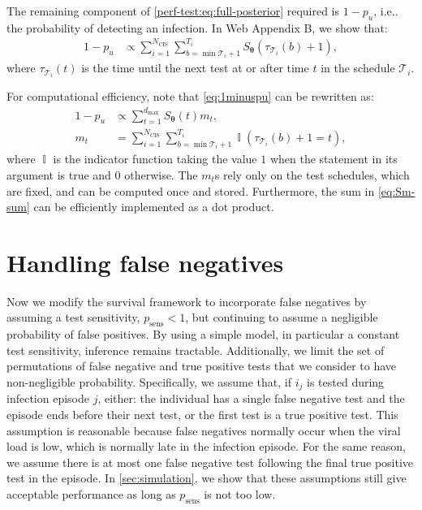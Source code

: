 \documentclass[referee,useAMS,usenatbib]{biom}
\makeatletter
\DeclareMathOperator{\indicator}{\mathbb{I}}
\renewcommand{\vec}[1]{\bm{#1}}
\newcommand{\dmax}{d_\text{max}}
\newcommand{\psens}{p_\text{sens}}
\newcommand{\Ncis}{N_\text{CIS}}
\newcommand{\sched}{\mathcal{T}}
\DeclareRobustCommand\onedot{\futurelet\@let@token\@onedot}
\def\@onedot{\ifx\@let@token.\else.\null\fi\xspace}
\def\ie{i.e\onedot} \def\Ie{{I.e}\onedot}
\makeatother
\begin{document}
The remaining component of \cref{perf-test:eq:full-posterior} required is $1- p_u$, \ie the probability of detecting an infection.
In Web Appendix B, we show that:
\begin{align}
  1 - p_u
  &\propto \sum_{i=1}^{\Ncis}\sum_{b = \min \sched_{i} + 1}^{T_{i}} S_{\vec{\theta}}(\tau_{\sched_{i}}(b) + 1),
  \label{eq:1minuspu}
\end{align}
where $\tau_{\sched_i}(t)$ is the time until the next test at or after time $t$ in the schedule $\sched_i$.

For computational efficiency, note that \cref{eq:1minuspu} can be rewritten as:
\begin{align}
  1- p_u
  &\propto \sum_{t=1}^{\dmax} S_{\vec\theta}(t) m_t,
  \label{eq:Sm-sum} \\
  m_t &= \sum_{i=1}^{\Ncis} \sum_{b = \min \sched_{i} + 1}^{T_{i}} \indicator(\tau_{\sched_{i}}(b) + 1 = t),
\end{align}
where $\indicator$ is the indicator function taking the value $1$ when the statement in its argument is true and $0$ otherwise.
The $m_t$s rely only on the test schedules, which are fixed, and can be computed once and stored.
Furthermore, the sum in \cref{eq:Sm-sum} can be efficiently implemented as a dot product.

\section{Handling false negatives} \label{sec:false-negatives}

Now we modify the survival framework to incorporate false negatives by assuming a test sensitivity, $\psens < 1$, but continuing to assume a negligible probability of false positives.
By using a simple model, in particular a constant test sensitivity, inference remains tractable.
Additionally, we limit the set of permutations of false negative and true positive tests that we consider to have non-negligible probability.
Specifically, we assume that, if $i_j$ is tested during infection episode $j$, either: the individual has a single false negative test and the episode ends before their next test, or the first test is a true positive test.
This assumption is reasonable because false negatives normally occur when the viral load is low, which is normally late in the infection episode.
For the same reason, we assume there is at most one false negative test following the final true positive test in the episode.
In \cref{sec:simulation}, we show that these assumptions still give acceptable performance as long as $\psens$ is not too low.
\end{document}
